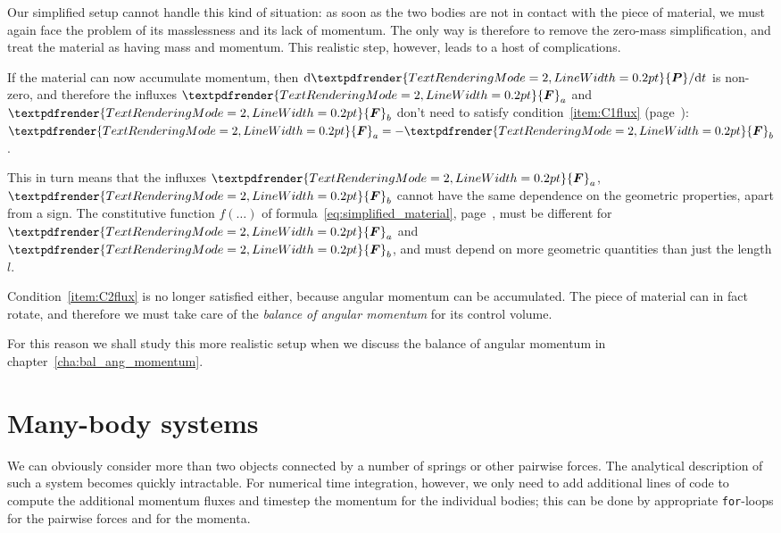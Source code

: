 \documentclass[a4paper,12pt,%
onecolumn,oneside,%
british%
]{memoir}
\renewcommand*{\bm}[1]{\textpdfrender{TextRenderingMode=2,LineWidth=0.2pt}{\boldsymbol{#1}}}
\newcommand*{\di}{\mathrm{d}}%
\renewcommand*{\|}[1][]{\nonscript\:#1\vert\nonscript\:\mathopen{}}
\newcommand*{\chap}{chapter}%
\newcommand*{\yle}{l}
\newcommand*{\dt}{\di t}
\newcommand*{\yP}{\bm{P}}
\newcommand*{\yF}{\bm{F}}
\newcommand*{\yFa}{\yF_{a}}
\newcommand*{\yFb}{\yF_{b}}
\begin{document}
Our simplified setup cannot handle this kind of situation: as soon as the two bodies are not in contact with the piece of material, we must again face the problem of its masslessness and its lack of momentum. The only way is therefore to remove the zero-mass simplification, and treat the material as having mass and momentum. This realistic step, however, leads to a host of complications.

If the material can now accumulate momentum, then $\di\yP/\dt$ is non-zero, and therefore the influxes $\yFa$ and $\yFb$ don't need to satisfy condition~\ref{item:C1flux} (page~\pageref{item:C1flux}): $\yFa = -\yFb$.

This in turn means that the influxes $\yFa$, $\yFb$ cannot have the same dependence on the geometric properties, apart from a sign. The constitutive function $f(\dotso)$ of formula~\eqref{eq:simplified_material}, page~\pageref{eq:simplified_material}, must
be different for $\yFa$ and $\yFb$, and must depend on more geometric quantities than just the length $\yle$.

Condition~\ref{item:C2flux} is no longer satisfied either, because angular momentum can be accumulated. The piece of material can in fact rotate, and therefore we must take care of the \emph{balance of angular momentum} for its control volume.

For this reason we shall study this more realistic setup when we discuss the balance of angular momentum in \chap~\ref{cha:bal_ang_momentum}.

\section{Many-body systems}
\label{sec:many-body}

We can obviously consider more than two objects connected by a number of springs or other pairwise forces. The analytical description of such a system becomes quickly intractable. For numerical time integration, however, we only need to add additional lines of code to compute the additional momentum fluxes and timestep the momentum for the individual bodies; this can be done by appropriate \texttt{for}-loops for the pairwise forces and for the momenta.
\end{document}
